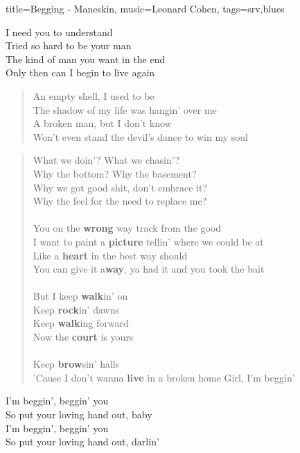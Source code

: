 \begin{song}{title={Begging - Maneskin}, music={Leonard Cohen}, tags={srv,blues}}
\begin{bridge}
	I need you to understand \\
	Tried so hard to be your man \\
	The kind of man you want in the end \\
	Only then can I begin to live again 
\end{bridge}
\begin{verse}
	An empty shell, I used to be \\
	The shadow of my life was hangin' over me \\
	A broken man, but I don't know \\
	Won't even stand the devil's dance to win my soul
\end{verse}
\begin{verse}
	What we doin'? What we chasin'? \\
	Why the bottom? Why the basement? \\
	Why we got good shit, don't embrace it? \\
	Why the feel for the need to replace me? \\ \\
	You on the \textbf{wrong} way track from the good \\
	I want to paint a \textbf{picture} tellin' where we could be at \\
	Like a \textbf{heart} in the best way should \\
	You can give it a\textbf{way}, ya had it and you took the bait\\ \\
	But I keep \textbf{walk}in' on \\
	Keep \textbf{rock}in' dawns \\
	Keep \textbf{walk}ing forward \\
	Now the \textbf{court} is yours \\ \\
	Keep \textbf{brow}sin' halls \\
	'Cause I don't wanna \textbf{live} in a broken home
	Girl, I'm beggin'
\end{verse}

\begin{chorus}
	I'm beggin', beggin' you \\
	So put your loving hand out, baby \\
	I'm beggin', beggin' you \\
	So put your loving hand out, darlin'
\end{chorus}


\end{song}
